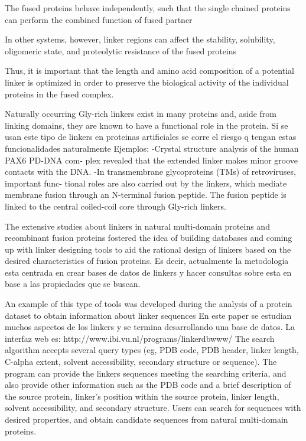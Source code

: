 The fused proteins behave independently, such that the single chained proteins can perform the combined function of fused partner

In other systems, however, linker regions can affect the stability, solubility, oligomeric state, and proteolytic resistance of the fused proteins

Thus, it is important that the length and amino acid composition of a potential linker is optimized in order to preserve the biological activity of the individual proteins in the fused complex.


Naturally occurring Gly-rich linkers exist in many proteins and, aside from linking domains, they are known to have a functional role in the protein. 
Si se usan este tipo de linkers en proteinas artificiales se corre el riesgo q tengan estas funcionalidades naturalmente
Ejemplos: 
-Crystal structure analysis of the human PAX6 PD-DNA com-
plex revealed that the extended linker makes minor
groove contacts with the DNA. 
-In transmembrane glycoproteins (TMs) of retroviruses, important func-
tional roles are also carried out by the linkers, which
mediate membrane fusion through an N-terminal
fusion peptide. The fusion peptide is linked to the
central coiled-coil core through Gly-rich linkers.






The extensive studies about linkers in natural multi-domain proteins and recombinant fusion proteins fostered the idea of building databases and coming up with linker designing tools to aid the rational design of linkers based on the desired characteristics of fusion proteins.
Es decir, actualmente la metodologia esta centrada en crear bases de datos de linkers y hacer consultas sobre esta en base a las propiedades que se buscan.


An example of this type of tools was developed during the analysis of a protein dataset to obtain information about linker sequences \cite{george2002analysis}
En este paper se estudian muchos aspectos de los linkers y se termina desarrollando una base de datos. La interfaz web es: http://www.ibi.vu.nl/programs/linkerdbwww/
The search algorithm accepts several query types (eg, PDB code, PDB header, linker length, C-alpha extent, solvent accessibility, secondary structure or sequence). 
The program can provide the linkers sequences meeting the searching criteria, and also provide other
information such as the PDB code and a brief description of the source protein, linker’s
position within the source protein, linker length, solvent accessibility, and secondary
structure. Users can search for sequences with desired properties, and obtain candidate
sequences from natural multi-domain proteins.


